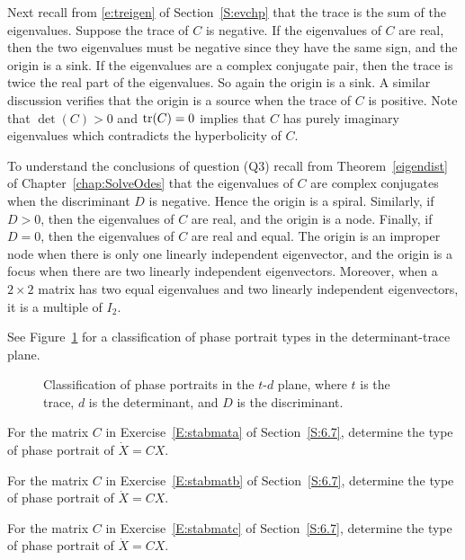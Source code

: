 \documentclass{ximera}
\begin{document}
Next recall from \eqref{e:treigen} of Section~\ref{S:evchp} that the trace is 
the sum of the 
eigenvalues. Suppose the trace of $C$ is negative.  If the eigenvalues
of $C$ are real, then the two eigenvalues must be negative since they
have the same sign, and the origin is a sink.  If the eigenvalues are
a complex conjugate pair, then the trace is twice the real part of the
eigenvalues.  So again the origin is a sink.  A similar discussion
verifies that the origin is a source when the trace of $C$ is positive.
Note that $\det(C)>0$ and ${\rm tr}(C)= 0$ implies that $C$ has purely
imaginary eigenvalues which contradicts the hyperbolicity of $C$.

To understand the conclusions of question (Q3) recall from
Theorem~\ref{eigendist} of Chapter~\ref{chap:SolveOdes} that the 
eigenvalues of $C$ are complex
conjugates when the discriminant $D$ is negative. Hence the origin is
a spiral.  Similarly, if $D>0$, then the eigenvalues of $C$ are real,
and the origin is a node.  Finally, if $D=0$, then the eigenvalues of
$C$ are real and equal.  The origin is an improper node when there is
only one linearly independent eigenvector, and the origin is a focus
when there are two linearly independent eigenvectors.  Moreover, when
a $2\times 2$ matrix has two equal eigenvalues and two linearly
independent eigenvectors, it is a multiple of $I_2$.

See Figure~\ref{F:td} for a classification of phase portrait types
in the determinant-trace plane.

\begin{figure}[htb]
           \centerline{%
           }
           \caption{Classification of phase portraits in the
		$t$-$d$ plane, where $t$ is the trace, $d$ is the
	determinant, and $D$ is the discriminant.}
           \label{F:td}
\end{figure}

\EXER

\TEXER

\begin{exercise} \label{c6.8.1a}
For the matrix $C$ in Exercise~\ref{E:stabmata} of Section~\ref{S:6.7},
determine the type of phase portrait of $\dot{X}=CX$.
\end{exercise}
\begin{exercise} \label{c6.8.1b}
For the matrix $C$ in Exercise~\ref{E:stabmatb} of Section~\ref{S:6.7}, 
determine the type of phase portrait of $\dot{X}=CX$.
\end{exercise}
\begin{exercise} \label{c6.8.1c}
For the matrix $C$ in Exercise~\ref{E:stabmatc}  of Section~\ref{S:6.7},
determine the type of phase portrait of $\dot{X}=CX$.
\end{exercise}
\end{document}
